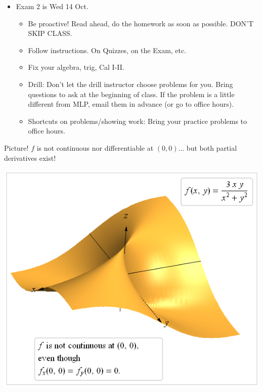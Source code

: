 \documentclass[12pt]{beamer}
\theoremstyle{plain}
\theoremstyle{definition}
\begin{document}
%
\begin{frame}
\begin{itemize}
\item Exam 2 is Wed 14 Oct.
	\begin{itemize}
	\item Be proactive!  Read ahead, do the homework as soon as possible.  DON'T SKIP CLASS.
	\item Follow instructions.  On Quizzes, on the Exam, etc.
	\item Fix your algebra, trig, Cal I-II.
	\item Drill: Don't let the drill instructor choose problems for you.  Bring questions to ask at the beginning of class.  If the problem is a little different from MLP, email them in advance (or go to office hours).
	\item Shortcuts on problems/showing work: Bring your practice problems to office hours.
	\end{itemize}
\end{itemize}
\end{frame}

% 
\begin{frame}{\small Picture!}\footnotesize
$f$ is not continuous nor differentiable at $(0,0)$... but both partial derivatives exist!
\begin{center}
\includegraphics[scale=0.4]{12-4diff}
\end{center}
\end{frame}
\end{document}
